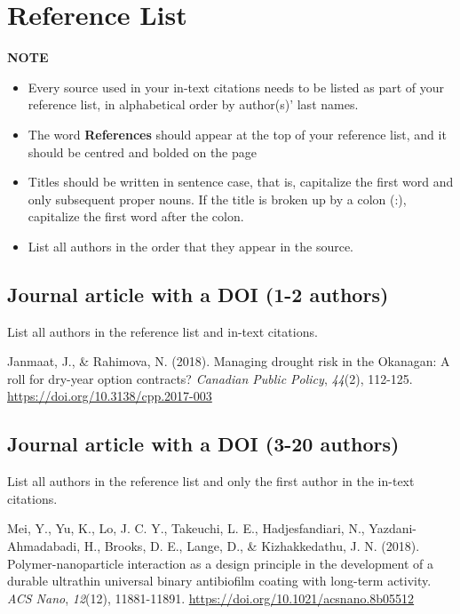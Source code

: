 \documentclass[
]{book}
\providecommand{\tightlist}{%
  \setlength{\itemsep}{0pt}\setlength{\parskip}{0pt}}
\begin{document}
\section{Reference List}\label{reference-list}

\textbf{NOTE}

\begin{itemize}
\tightlist
\item
  Every source used in your in-text citations needs to be listed as part of your reference list, in alphabetical order by author(s)' last names.
\item
  The word \textbf{References} should appear at the top of your reference list, and it should be centred and bolded on the page
\item
  Titles should be written in sentence case, that is, capitalize the first word and only subsequent proper nouns. If the title is broken up by a colon (:), capitalize the first word after the colon.
\item
  List all authors in the order that they appear in the source.
\end{itemize}

\subsection*{Journal article with a DOI (1-2 authors)}\label{journal-article-with-a-doi-1-2-authors}

List all authors in the reference list and in-text citations.

Janmaat, J., \& Rahimova, N. (2018). Managing drought risk in the Okanagan: A roll for dry-year option contracts? \emph{Canadian Public Policy}, \emph{44}(2), 112-125. \url{https://doi.org/10.3138/cpp.2017-003}

\subsection*{Journal article with a DOI (3-20 authors)}\label{journal-article-with-a-doi-3-20-authors}

List all authors in the reference list and only the first author in the in-text citations.

Mei, Y., Yu, K., Lo, J. C. Y., Takeuchi, L. E., Hadjesfandiari, N., Yazdani-Ahmadabadi, H., Brooks, D. E., Lange, D., \& Kizhakkedathu, J. N. (2018). Polymer-nanoparticle interaction as a design principle in the development of a durable ultrathin universal binary antibiofilm coating with long-term activity. \emph{ACS Nano}, \emph{12}(12), 11881-11891. \url{https://doi.org/10.1021/acsnano.8b05512}
\end{document}

